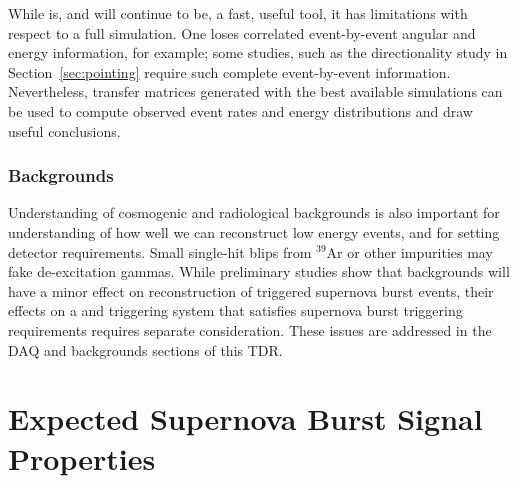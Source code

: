 While  is, and will continue to be, a fast, useful tool,
it has limitations with respect to a full simulation.  One loses correlated
event-by-event angular and energy information, for example; some
studies, such as the directionality study in
Section~\ref{sec:pointing} require such complete event-by-event information.
Nevertheless, transfer matrices generated with the best available
simulations can be used to compute observed event rates and energy distributions and draw useful conclusions.


\subsubsection{Backgrounds}

Understanding of cosmogenic and radiological
backgrounds is also important for understanding of how
well we can reconstruct low energy events, and for setting detector
requirements.  Small single-hit blips from $^{39}$Ar or other
impurities may fake de-excitation gammas.  While preliminary studies
show that backgrounds will have a minor effect on reconstruction of
triggered supernova burst events, their effects on a  and
triggering system that satisfies supernova burst triggering
requirements requires separate consideration.
These issues are addressed in the DAQ and backgrounds sections of this
TDR.


\section{Expected Supernova Burst Signal Properties}\label{sec:sn-signals}


